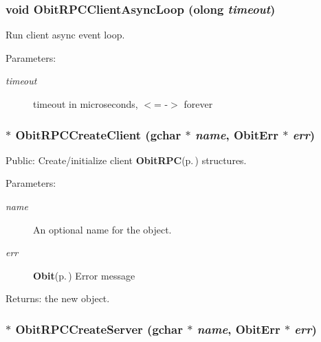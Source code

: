 \subsubsection{\setlength{\rightskip}{0pt plus 5cm}void Obit\-RPCClient\-Async\-Loop ({\bf olong} {\em timeout})}\label{ObitRPC_8h_a25}


Run client async event loop. 

\begin{Desc}
\item[Parameters:]
\begin{description}
\item[{\em timeout}]timeout in microseconds, $<$= -$>$ forever \end{description}
\end{Desc}
\subsubsection{$\ast$ Obit\-RPCCreate\-Client (gchar $\ast$ {\em name}, {\bf Obit\-Err} $\ast$ {\em err})}\label{ObitRPC_8h_a17}


Public: Create/initialize client {\bf Obit\-RPC}{\rm (p.\,\pageref{structObitRPC})} structures. 

\begin{Desc}
\item[Parameters:]
\begin{description}
\item[{\em name}]An optional name for the object. \item[{\em err}]{\bf Obit}{\rm (p.\,\pageref{structObit})} Error message \end{description}
\end{Desc}
\begin{Desc}
\item[Returns:]the new object. \end{Desc}
\subsubsection{$\ast$ Obit\-RPCCreate\-Server (gchar $\ast$ {\em name}, {\bf Obit\-Err} $\ast$ {\em err})}\label{ObitRPC_8h_a18}


